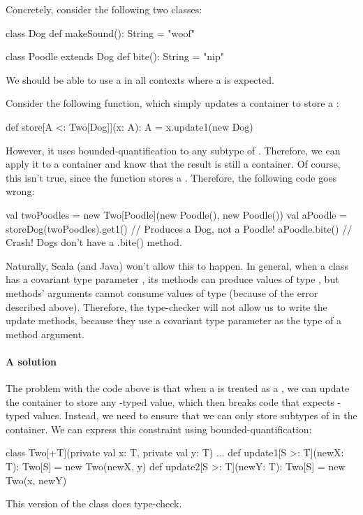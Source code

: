 \documentclass[9pt]{extbook}
\begin{document}
Concretely, consider the following two classes:
\begin{scalacode}
class Dog {
  def makeSound(): String = "woof"
}

class Poodle extends Dog {
  def bite(): String = "nip"
}
\end{scalacode}

We should be able to use a  in all contexts where
a  is expected.


Consider the following function, which simply updates a container to
store a :
\begin{scalacode}
def store[A <: Two[Dog]](x: A): A = x.update1(new Dog)
\end{scalacode}
However, it uses bounded-quantification to any subtype of
. Therefore, we can apply it to a 
container and know that the result is still a 
container. Of course, this isn't true, since the function stores
a . Therefore, the following code goes wrong:
\begin{scalacode}
val twoPoodles = new Two[Poodle](new Poodle(), new Poodle())
val aPoodle = storeDog(twoPoodles).get1() // Produces a Dog, not a Poodle!
aPoodle.bite() // Crash! Dogs don't have a .bite() method.
\end{scalacode}

Naturally, Scala (and Java) won't allow this to happen. In general, when
a class has a covariant type parameter , its methods can
produce values of type , but methods' arguments cannot consume
values of type  (because of the error described above). Therefore, the type-checker
will not allow us to write the update methods, because they use
a covariant type parameter as the type of a method argument.

\paragraph{A solution}
The problem with the code above is that when a 
is treated as a , we can update the container to
store any -typed value, which then breaks code that expects
-typed values. Instead, we need to ensure that we can only store
subtypes of  in the container. We can express this constraint
using bounded-quantification:

\begin{scalacode}
class Two[+T](private val x: T, private val y: T) {
  ...
  def update1[S >: T](newX: T): Two[S] = new Two(newX, y)
  def update2[S >: T](newY: T): Two[S] = new Two(x, newY)
}
\end{scalacode}
This version of the class does type-check.
\end{document}
